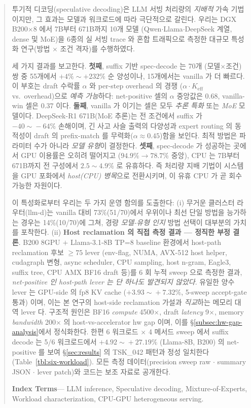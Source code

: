 
\begin{abstract}
투기적 디코딩(speculative decoding)은 LLM 서빙 처리량의 \emph{지배적} 가속 기법이지만,
그 효과는 모델과 워크로드에 따라 극단적으로 갈린다.
우리는 DGX B200$\times$8 에서 7B부터 671B까지 10개 모델
(Qwen$\cdot$Llama$\cdot$DeepSeek 계열, dense 및 MoE)을
6종의 실 서빙 trace 와 혼합 트래픽으로 측정한
대규모 특성화 연구(방법 $\times$ 조건 격자)를 수행하였다.

세 가지 결과를 보고한다.
\textbf{첫째}, suffix 기반 spec-decode 는 70개 (모델$\times$조건) 쌍 중 55개에서
$+4\%\sim+232\%$ 순 양성이나, 15개에서는 vanilla 가 더 빠르다.
이 부호는 draft 수락률 $\alpha$ 와 per-step overhead 의 경쟁
($\alpha\!\cdot\!K_{\mathrm{eff}}$ vs.\ overhead)으로 \emph{예측 가능}하다:
net-positive 셀의 $\alpha$ 중앙값은 $0.68$, vanilla-win 셀은 $0.37$ 이다.
\textbf{둘째}, vanilla 가 이기는 셀은 모두 \emph{추론 특화} 또는 \emph{MoE} 모델이다.
DeepSeek-R1 671B(MoE 추론)는 전 조건에서 suffix 가 $-40\!\sim\!-64\%$ 손해이며,
긴 사고 사슬 출력의 다양성과 expert routing 의 동적성이 draft 의
prefix-match 를 무력화($\alpha\!\approx\!0.45$)함을 보인다.
최적 방법은 파라미터 수가 아니라 \emph{모델 유형}이 결정한다.
\textbf{셋째}, spec-decode 가 성공하는 곳에서 GPU 이용률은 오히려 떨어지고
($94.9\%\!\to\!78.7\%$ 중앙), CPU 는 7B부터 671B까지 전 구성에서
$2.5\!\sim\!4.9\%$ 로 유휴하다.
즉 처리량 지배 기법이 시스템을 GPU 포화에서 \emph{host(CPU) 병목}으로 전환시키며,
이 유휴 CPU 가 곧 회수 가능한 자원이다.

이 특성화로부터 우리는 두 가지 운영 함의를 도출한다:
(i) 무거운 클러스터 라우터(llm-d)는 vanilla 대비 73\%(51/70)에서 우위이나
최선 단일 방법을 능가하는 경우는 14\%(10/70)에 그쳐, 경량 \emph{모델-유형 인지} 방법 선택이
대부분의 가치를 포착한다.
(ii) \textbf{Host reclamation 의 직접 측정 결과 — 정직한 부정 결론}.
B200 8GPU $+$ Llama-3.1-8B TP=8 baseline 환경에서 host-path reclamation 후보
$\ge\!75$ lever (env-flag, NUMA, AVX-512 host helper, cudagraph 변형, async scheduler,
CPU sampling, host n-gram, Eagle3, suffix tree, CPU AMX BF16 draft 등)를
6 회 누적 sweep 으로 측정한 결과, \emph{net-positive 인 host-path lever 는 단 하나도 발견되지 않았다}.
유일한 양수 lever 는 GPU-side 의 fp8 KV cache ($+3.93\!\sim\!+7.32\%$, 5-sweep accept-gate 통과)
이며, 이는 본 연구의 host-side reclamation 가설과 \emph{직교}하는 메모리 대역 lever 다.
구조적 원인은 BF16 \emph{compute} 4500$\times$, draft \emph{latency} 9$\times$, memory \emph{bandwidth} 200$\times$ 의
host-vs-accelerator hw gap 이며, 이를 \S\ref{subsec:hw-gap-analysis}에서 정식화한다.
한편 6 워크로드 $\times$ 4 메서드 sweep 에서 suffix decode 는 5/6 워크로드에서
$+4.92\!\sim\!+27.19\%$ (Llama-8B, B200) 의 net-positive 를 보여 \S\ref{sec:results} 의
TSK\_042 패턴과 정성 일치한다 (Table~\ref{tbl:six-workload}).
모든 측정 데이터(precision sweep raw $\cdot$ summary JSON $\cdot$ lever patch)와 코드는 보조 자료로 공개한다.

\smallskip
\noindent\textbf{Index Terms}---
LLM inference, Speculative decoding, Mixture-of-Experts, Workload characterization,
CPU-GPU heterogeneous serving.
\end{abstract}
